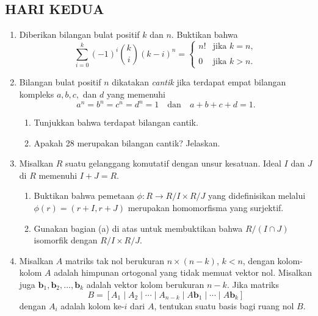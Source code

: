 \documentclass[12pt,twoside]{article}
\begin{document}
\subsection{HARI KEDUA}
\begin{enumerate}
    \item Diberikan bilangan bulat positif $k$ dan $n$. Buktikan bahwa
          \[
              \sum_{i=0}^{k} (-1)^i \binom{k}{i} (k - i)^n =
              \begin{cases}
                  n! & \text{jika } k = n, \\\\
                  0  & \text{jika } k > n.
              \end{cases}
          \]

    \item Bilangan bulat positif $n$ dikatakan \textit{cantik} jika terdapat empat bilangan kompleks $a, b, c,$ dan $d$ yang memenuhi
          \[
              a^n = b^n = c^n = d^n = 1 \quad \text{dan} \quad a + b + c + d = 1.
          \]
          \begin{enumerate}
              \item Tunjukkan bahwa terdapat bilangan cantik.
              \item Apakah 28 merupakan bilangan cantik? Jelaskan.
          \end{enumerate}

    \item Misalkan $R$ suatu gelanggang komutatif dengan unsur kesatuan. Ideal $I$ dan $J$ di $R$ memenuhi $I + J = R$.
          \begin{enumerate}
              \item Buktikan bahwa pemetaan $\phi : R \to R/I \times R/J$ yang didefinisikan melalui $\phi(r) = (r + I, r + J)$ merupakan homomorfisma yang surjektif.
              \item Gunakan bagian (a) di atas untuk membuktikan bahwa
                    \(
                    R / (I \cap J)
                    \) isomorfik dengan \(R/I\times R/J\).
          \end{enumerate}

    \item Misalkan $A$ matriks tak nol berukuran $n \times (n - k)$, $k < n$, dengan kolom-kolom $A$ adalah himpunan ortogonal yang tidak memuat vektor nol. Misalkan juga $\mathbf{b}_1, \mathbf{b}_2, \dots, \mathbf{b}_k$ adalah vektor kolom berukuran $n - k$. Jika matriks
          \[
              B = \left[A_1 \mid A_2 \mid \cdots \mid A_{n-k} \mid A\mathbf{b}_1 \mid \cdots \mid A\mathbf{b}_k\right]
          \]
          dengan $A_i$ adalah kolom ke-$i$ dari $A$, tentukan suatu basis bagi ruang nol $B$.


\end{enumerate}
\end{document}
